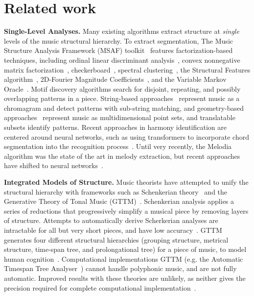 \section{Related work}
\label{sec:related_work}

\noindent\textbf{Single-Level Analyses.}
Many existing algorithms extract structure at \textit{single} levels of the music structural hierarchy. To extract segmentation, The Music Structure Analysis Framework (MSAF) toolkit~\cite{msaf} features factorization-based techniques, including ordinal linear discriminant analysis~\cite{olda}, convex nonnegative matrix factorization~\cite{cnmf}, checkerboard~\cite{checkerboard}, spectral clustering~\cite{sCluster}, the Structural Features algorithm~\cite{sf}, 2D-Fourier Magnitude Coefficients~\cite{2dfmc}, and the Variable Markov Oracle~\cite{vmo_segmentation}. Motif discovery algorithms search for disjoint, repeating, and possibly overlapping patterns in a piece. String-based approaches~\cite{vmo_motifs} represent music as a chromagram and detect patterns with sub-string matching, and geometry-based approaches~\cite{Hsiao_2023_motifs} represent music as multidimensional point sets, and translatable subsets identify patterns. Recent approaches in harmony identification are centered around neural networks, such as using transformers to incorporate chord segmentation into the recognition process~\cite{chen_2019_harmony,harmonytransformerV2}. Until very recently, the Melodia algorithm was the state of the art in melody extraction, but recent approaches have shifted to neural networks~\cite{kosta_22_melody,midibert}. 

\smallskip\noindent\textbf{Integrated Models of Structure.}
Music theorists have attempted to unify the structural hierarchy with frameworks such as Schenkerian theory~\cite{schenkerian} and the Generative Theory of Tonal Music (GTTM)~\cite{gttm}. Schenkerian analysis applies a series of reductions that progressively simplify a musical piece by removing layers of structure. Attempts to automatically derive Scherkerian analyses are intractable for all but very short pieces, and have low accuracy~\cite{schenkerian}. GTTM generates four different structural hierarchies (grouping structure, metrical structure, time-span tree, and prolongational tree) for a piece of music, to model human cognition~\cite{gttm_implementation}. Computational implementations GTTM (e.g. the Automatic Timespan Tree Analyser~\cite{gttm_implementation}) cannot handle polyphonic music, and are not fully automatic. Improved results with these theories are unlikely, as neither gives the precision required for complete computational implementation~\cite{marsden2013}.

